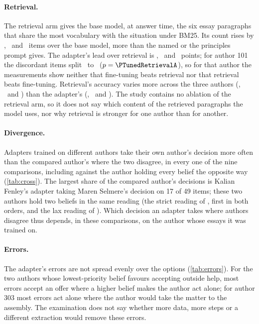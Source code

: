 \paragraph{Retrieval.}
The retrieval arm gives the base model, at answer time, the six essay paragraphs that share
the most vocabulary with the situation under BM25. Its count rises by \LiftARetrieval,
\LiftBRetrieval\ and \LiftCRetrieval\ items over the base model, more than the named or the
principles prompt gives. The adapter's lead over retrieval is \LeadPtsTunedRetrievalA,
\LeadPtsTunedRetrievalB\ and \LeadPtsTunedRetrievalC\ points; for author 101 the discordant items
split \OnlyFirstTunedRetrievalA\ to \OnlySecondTunedRetrievalA\ ($p=\PTunedRetrievalA$), so for
that author the measurements show neither that fine-tuning beats retrieval nor that retrieval
beats fine-tuning. Retrieval's accuracy varies more across the three authors (\AccARetrieval,
\AccBRetrieval\ and \AccCRetrieval) than the adapter's (\AccATuned, \AccBTuned\ and \AccCTuned).
The study contains no ablation of the retrieval arm, so it does not say which content of the
retrieved paragraphs the model uses, nor why retrieval is stronger for one author than for
another.

\paragraph{Divergence.}
Adapters trained on different authors take their own author's decision more often than the
compared author's where the two disagree, in every one of the nine comparisons, including
against the author holding every belief the opposite way (\cref{tab:cross}). The largest
share of the compared author's decisions is Kalian Fenley's adapter taking Maren Selmere's
decision on 17 of 49 items; these two authors hold two beliefs in the same reading (the
strict reading of , first in both orders, and the lax reading of
). Which decision an adapter takes where authors disagree thus depends,
in these comparisons, on the author whose essays it was trained on.

\paragraph{Errors.}
The adapter's errors are not spread evenly over the options (\cref{tab:errors}). For the two
authors whose lowest-priority belief favours accepting outside help, most errors accept an
offer where a higher belief makes the author act alone; for author 303 most errors act alone
where the author would take the matter to the assembly. The examination does not say whether
more data, more steps or a different extraction would remove these errors.

